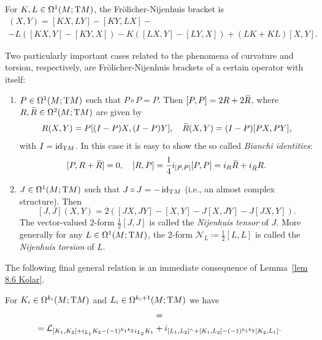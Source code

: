 \begin{lem}
    For $K,L\in\Omega^1(M;\mathrm{T} M)$, the Fr\"olicher-Nijenhuis bracket is 
    \begin{multline}
        [K,L](X,Y)=[KX,LY]-[KY,LX]-\\-L([KX,Y]-[KY,X])-K([LX,Y]-[LY,X])+(LK+KL)[X,Y].
    \end{multline}
\end{lem}

\begin{rem}\label{ex frolicher curvature and torsion}
    Two particularly important cases related to the phenomena of curvature and torsion, respectively, are  Fr\"olicher-Nijenhuis brackets of a certain operator with itself:
    \begin{enumerate}
        \item $P\in\Omega^1(M;\mathrm{T} M)$ such that $P\circ P=P$. Then $[P,P]=2R+2\wb{R}$, where $R,\wb{R}\in\Omega^2(M;\T M)$ are given by 
        \[R(X,Y)=P[(I-P)X,(I-P)Y],\quad \wb{R}(X,Y)=(I-P)[PX,PY],\]
        with $I=\operatorname{id}_{\mathrm{T} M}$. In this case it is easy to show the so called \emph{Bianchi identities}: 
        \[[P,R+\wb{R}]=0,\quad [R,P]=\frac14i_{[P,P]}[P,P]=i_R \wb{R}+i_{\wb{R}}R.\]
        \item $J\in\Omega^1(M;\mathrm{T} M)$ such that $J\circ J=-\operatorname{id}_{\mathrm{T} M}$ (i.e., an almost complex structure). Then 
        \[[J,J](X,Y)=2([JX,JY]-[X,Y]-J[X,JY]-J[JX,Y]).\]
        The vector-valued $2$-form $\frac{1}{2}[J,J]$ is called the \emph{Nijenhuis tensor} of $J$. More generally for any $L\in \Omega^1(M;\mathrm{T} M)$, the $2$-form $\mathcal{N}_L\coloneqq \frac12[L,L]$ is called the \emph{Nijenhuis torsion} of $L$.
    \end{enumerate}
\end{rem}


The following final general relation is an immediate consequence of Lemma~\ref{lem 8.6 Kolar}.

\begin{thm}
    For $K_i\in\Omega^{k_i}(M;\mathrm{T} M)$ and $L_i\in\Omega^{k_i+1}(M;\mathrm{T} M)$ we have 
    \begin{multline}
        [\Lie_{K_1}+i_{L_1},\Lie_{K_2}+i_{L_2}]=\\
        =\Lie_{[K_1,K_2]+i_{L_1}K_2-(-1)^{k_1k_2}i_{L_2}K_1}+
        i_{[L_1,L_2]^{\wedge}+[K_1,L_2]-(-1)^{k_1k_2}[K_2,L_1]}.
    \end{multline}
\end{thm}

